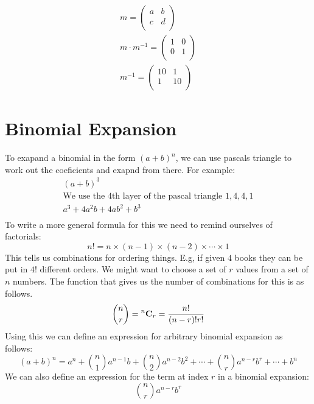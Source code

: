 \documentclass{article}
\begin{document}
\begin{gather*}
	m = \begin{pmatrix}
		a & b \\
		c & d \\
	\end{pmatrix}\\
	m \cdot m^{-1} = \begin{pmatrix}
		1 & 0 \\
		0 & 1 \\
	\end{pmatrix}\\
	m^{-1} = \begin{pmatrix}
		10 & 1 \\
		1 & 10 \\
	\end{pmatrix}
\end{gather*}


\section{Binomial Expansion}

To exapand a binomial in the form $(a + b)^n$, we can use pascals triangle to work out the coeficients and exapnd from there.
For example:
\begin{gather*}
	(a + b)^3 \\
	\text{We use the 4th layer of the pascal triangle $1, 4, 4, 1$} \\
	a^3 + 4a^2b + 4ab^2 + b^3 \\
\end{gather*}
To write a more general formula for this we need to remind ourselves of factorials:
\begin{equation}
	n! = n \times (n - 1) \times (n - 2) \times \cdots \times 1
\end{equation}
This tells us combinations for ordering things. E.g, if given $4$ books they can be put in $4!$ different
orders. We might want to choose a set of $r$ values from a set of $n$ numbers. The function that gives us the number of
combinations for this is as follows.
\begin{equation}
	\binom{n}{r} = \prescript{n}{}{\mathbf{C}_r} = \frac{n!}{(n - r)!r!}
\end{equation}
Using this we can define an expression for arbitrary binomial expansion as follows:
\begin{equation}
	(a + b)^n = a^n + \binom{n}{1}a^{n - 1}b + \binom{n}{2}a^{n - 2}b^{2} + \cdots + \binom{n}{r}a^{n - r}b^{r} + \cdots + b^n
\end{equation}
We can also define an expression for the term at index $r$ in a binomial expansion:
\begin{equation}
	\binom{n}{r}a^{n - r}b^{r}
\end{equation}
\end{document}
